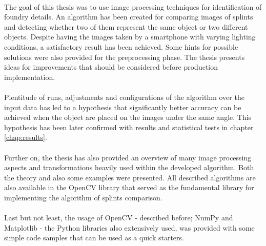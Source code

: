 \paragraph{}
The goal of this thesis was to use image processing techniques for identification of foundry details. An algorithm has been created for comparing images of splints and detecting whether two of them represent the same object or two different objects. Despite having the images taken by a smartphone with varying lighting conditions, a satisfactory result has been achieved. Some hints for possible solutions were also provided for the preprocessing phase. The thesis presents ideas for improvements that should be considered before production implementation.

\paragraph{}
Plentitude of runs, adjustments and configurations of the algorithm over the input data has led to a hypothesis that significantly better accuracy can be achieved when the object are placed on the images under the same angle. This hypothesis has been later confirmed with results and statistical tests in chapter \ref{chap:results}.

\paragraph{}
Further on, the thesis has also provided an overview of many image processing aspects and transformations heavily used within the developed algorithm. Both the theory and also some examples were presented. All described algorithms are also available in the OpenCV library that served as the fundamental library for implementing the algorithm of splints comparison.

\paragraph{}
Last but not least, the usage of OpenCV - described before; NumPy and Matplotlib - the Python libraries also extensively used, was provided with some simple code samples that can be used as a quick starters.